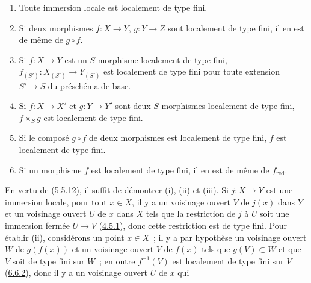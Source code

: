 \begin{proposition}[6.6.6]
\label{I.6.6.6-fr}
\begin{enumerate}
  \item[(i)] Toute immersion locale est localement de type fini.
  \item[(ii)] Si deux morphismes $f:X\to Y$, $g:Y\to Z$ sont localement de
    type fini, il en est de même de $g\circ f$.
  \item[(iii)] Si $f:X\to Y$ est un $S$-morphisme localement de type fini,
    $f_{(S')}:X_{(S')}\to Y_{(S')}$ est localement de type fini pour toute
    extension $S'\to S$ du préschéma de base.
  \item[(iv)] Si $f:X\to X'$ et $g:Y\to Y'$ sont deux $S$-morphismes
    localement de type fini, $f\times_S g$ est localement de type fini.
  \item[(v)] Si le composé $g\circ f$ de deux morphismes est localement de
    type fini, $f$ est localement de type fini.
  \item[(vi)] Si un morphisme $f$ est localement de type fini, il en est de
    même de $f_{\mathrm{red}}$.
\end{enumerate}
\end{proposition}

En vertu de (\hyperref[I.5.5.12-fr]{5.5.12}), il suffit de démontrer (i), (ii)
et (iii). Si $j:X\to Y$ est une immersion locale, pour tout $x\in X$, il y a
un voisinage ouvert $V$ de $j(x)$ dans $Y$ et un voisinage ouvert $U$ de $x$
dans $X$ tels que la restriction de $j$ à $U$ soit une immersion fermée
$U\to V$ (\hyperref[I.4.5.1-fr]{4.5.1}), donc cette restriction est de type
fini. Pour établir (ii), considérons un point $x\in X$~; il y a par hypothèse
un voisinage ouvert $W$ de $g(f(x))$ et un voisinage ouvert $V$ de $f(x)$
tels que $g(V)\subset W$ et que $V$ soit de type fini sur $W$~; en outre
$f^{-1}(V)$ est localement de type fini sur $V$
(\hyperref[I.6.6.2-fr]{6.6.2}), donc il y a un voisinage ouvert $U$ de $x$ qui
